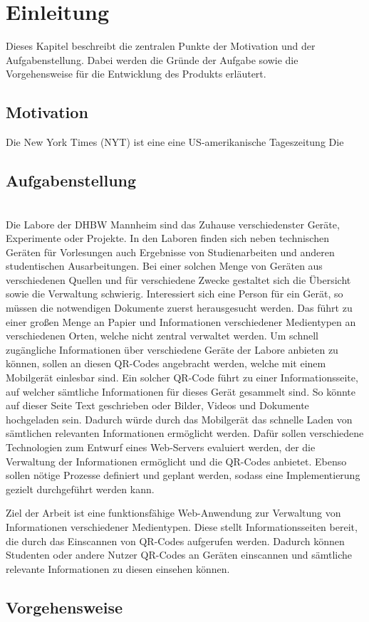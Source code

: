 \chapter{Einleitung}
\label{chap:1-intro}
\setcounter{page}{1}

Dieses Kapitel beschreibt die zentralen Punkte der Motivation und der Aufgabenstellung. Dabei werden die Gründe der Aufgabe sowie die Vorgehensweise für die Entwicklung des Produkts erläutert.

\section{Motivation} 
\label{sec:motivation}
Die New York Times (NYT) ist eine eine US-amerikanische Tageszeitung\autocite{NewYorkTimes2023}
Die 

\section{Aufgabenstellung} 
\label{sec:problem}


\\
Die Labore der DHBW Mannheim sind das Zuhause verschiedenster Geräte, Experimente oder Projekte. In den Laboren finden sich neben technischen Geräten für Vorlesungen auch Ergebnisse von Studienarbeiten und anderen 
studentischen Ausarbeitungen. Bei einer solchen Menge von Geräten aus verschiedenen Quellen und für verschiedene Zwecke gestaltet sich die Übersicht sowie die Verwaltung schwierig. Interessiert sich eine Person für 
ein Gerät, so müssen die notwendigen Dokumente zuerst herausgesucht werden. Das führt zu einer großen Menge an Papier und Informationen verschiedener Medientypen an verschiedenen Orten, welche nicht zentral verwaltet 
werden. Um schnell zugängliche Informationen über verschiedene Geräte der Labore anbieten zu können, sollen an diesen QR-Codes angebracht werden, welche mit einem Mobilgerät einlesbar sind. Ein solcher QR-Code führt 
zu einer Informationsseite, auf welcher sämtliche Informationen für dieses Gerät gesammelt sind. So könnte auf dieser Seite Text geschrieben oder Bilder, Videos und Dokumente hochgeladen sein. Dadurch würde durch das 
Mobilgerät das schnelle Laden von sämtlichen relevanten Informationen ermöglicht werden. Dafür sollen verschiedene Technologien zum Entwurf eines Web-Servers evaluiert werden, der die Verwaltung der Informationen ermöglicht 
und die QR-Codes anbietet. Ebenso sollen nötige Prozesse definiert und geplant werden, sodass eine Implementierung gezielt durchgeführt werden kann. 

Ziel der Arbeit ist eine funktionsfähige Web-Anwendung zur Verwaltung von Informationen verschiedener Medientypen. Diese stellt Informationsseiten bereit, die durch das Einscannen von QR-Codes aufgerufen werden. Dadurch 
können Studenten oder andere Nutzer QR-Codes an Geräten einscannen und sämtliche relevante Informationen zu diesen einsehen können.

\section{Vorgehensweise} 

